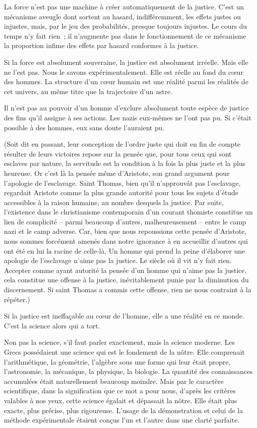 \documentclass[french,twoside]{book} %
\begin{document}
La force n'est pas une machine à créer automatiquement de la justice. C'est un mécanisme aveugle dont sortent au hasard, indifféremment, les effets justes ou injustes, mais, par le jeu des probabilités, presque toujours injustes. Le cours du temps n'y fait rien ; il n'augmente pas dans le fonctionnement de ce mécanisme la proportion infime des effets par hasard conformes à la justice.\par
Si la force est absolument souveraine, la justice est absolument irréelle. Mais elle ne l'est pas. Nous le savons expérimentalement. Elle est réelle au fond du cœur des hommes. La structure d'un cœur humain est une réalité parmi les réalités de cet univers, au même titre que la trajectoire d'un astre.\par
Il n'est pas au pouvoir d'un homme d'exclure absolument toute espèce de justice des fins qu'il assigne à ses actions. Les nazis eux-mêmes ne l'ont pas pu. Si c'était possible à des hommes, eux sans doute l'auraient pu.\par
(Soit dit en passant, leur conception de l'ordre juste qui doit en fin de compte résulter de leurs victoires repose sur la pensée que, pour tous ceux qui sont esclaves par nature, la servitude est la condition à la fois la plus juste et la plus heureuse. Or c'est là la pensée même d'Aristote, son grand argument pour l'apologie de l'esclavage. Saint Thomas, bien qu'il n'approuvât pas l'esclavage, regardait Aristote comme la plus grande autorité pour tous les sujets d'étude accessibles à la raison humaine, au nombre desquels la justice. Par suite, l'existence dans le christianisme contemporain d'un courant thomiste constitue un lien de complicité – parmi beaucoup d'autres, malheureusement – entre le camp nazi et le camp adverse. Car, bien que nous repoussions cette pensée d'Aristote, nous sommes forcément amenés dans notre ignorance à en accueillir d'autres qui ont été en lui la racine de celle-là. Un homme qui prend la peine d'élaborer une apologie de l'esclavage n'aime pas la justice. Le siècle où il vit n'y fait rien. Accepter comme ayant autorité la pensée d'un homme qui n'aime pas la justice, cela constitue une offense à la justice, inévitablement punie par la diminution du discernement. Si saint Thomas a commis cette offense, rien ne nous contraint à la répéter.)\par
Si la justice est ineffaçable au cœur de l'homme, elle a une réalité en ce monde. C'est la science alors qui a tort.\par
Non pas la science, s'il faut parler exactement, mais la science moderne. Les Grecs possédaient une science qui est le fondement de la nôtre. Elle comprenait l'arithmétique, la géométrie, l'algèbre sous une forme qui leur était propre, l'astronomie, la mécanique, la physique, la biologie. La quantité des connaissances accumulées était naturellement beaucoup moindre. Mais par le caractère scientifique, dans la signification que ce mot a pour nous, d'après les critères valables à nos yeux, cette science égalait et dépassait la nôtre. Elle était plus exacte, plus précise, plus rigoureuse. L'usage de la démonstration et celui de la méthode expérimentale étaient conçus l'un et l'autre dans une clarté parfaite.\par
\end{document}
